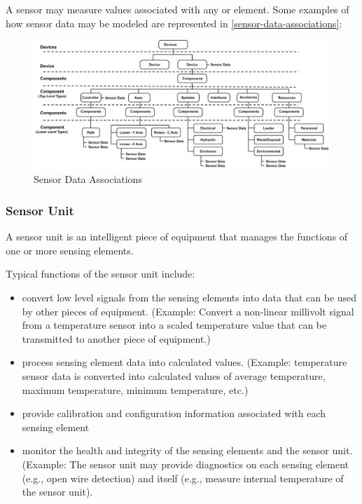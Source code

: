 A sensor may measure values associated with any  or  element.   Some examples of how sensor data may be modeled are represented in \ref{sensor-data-associations}:

\begin{figure}[ht]
  \centering
  \includegraphics[width=.75\textwidth]{figures/sensor-data-associations.png}
  \caption{Sensor Data Associations}
  \label{fig:sensor-data-associations}
\end{figure}

\subsubsection{Sensor Unit}
\label{sec:Sensor Unit}

A \gls{sensor unit} is an intelligent piece of equipment that manages the functions of one or more \glspl{sensing element}.

Typical functions of the \gls{sensor unit} include:

\begin{itemize}
\item convert low level signals from the \glspl{sensing element} into data that can be used by other pieces of equipment.  (Example:  Convert a non-linear millivolt signal from a temperature sensor into a scaled temperature value that can be transmitted to another piece of equipment.)

\item process \gls{sensing element} data into calculated values.  (Example:  temperature sensor data is converted into calculated values of average temperature, maximum temperature, minimum temperature, etc.)

\item provide calibration and configuration information associated with each \gls{sensing element}

\item monitor the health and integrity of the \glspl{sensing element} and the \gls{sensor unit}.  (Example:  The \gls{sensor unit} may provide diagnostics on each \gls{sensing element} (e.g., open wire detection) and itself (e.g., measure internal temperature of the \gls{sensor unit}).
\end{itemize}

